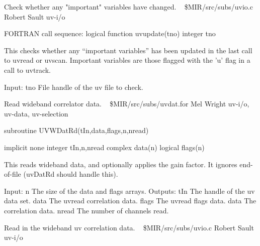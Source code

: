%
\noindent Check whether any "important" variables have changed.
\newline \ 
\newline {} \$MIR/src/subs/uvio.c
\newline {} Robert Sault
\newline {} uv-i/o
\par{\tenpoint
{\eightpoint\begintt
FORTRAN call sequence:
        logical function uvupdate(tno)
        integer tno

  This checks whether any ``important variables'' has been updated in the
  last call to uvread or uvscan. Important variables are those flagged
  with the 'u' flag in a call to uvtrack.

  Input:
    tno         File handle of the uv file to check.                    
\endtt}
\par}
%
\noindent Read wideband correlator data.
\newline \ 
\newline {} \$MIR/src/subs/uvdat.for
\newline {} Mel Wright
\newline \abox{Keywords:} uv-i/o, uv-data, uv-selection
\par{\tenpoint
{\eightpoint\begintt
        subroutine UVWDatRd(tIn,data,flags,n,nread)

        implicit none
        integer tIn,n,nread
        complex data(n)
        logical flags(n)

  This reads wideband data, and optionally applies the gain factor. It
  ignores end-of-file (uvDatRd should handle this).

  Input:
    n          The size of the data and flags arrays.
  Outputs:
    tIn        The handle of the uv data set.
    data       The uvread correlation data.
    flags      The uvread flags data.
    data       The correlation data.
    nread      The number of channels read.
\endtt}
\par}
%
\noindent Read in the wideband uv correlation data.
\newline \ 
\newline {} \$MIR/src/subs/uvio.c
\newline \abox{Responsible:} Robert Sault
\newline {} uv-i/o
